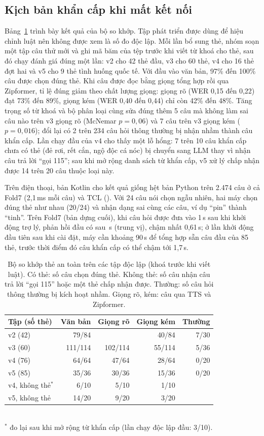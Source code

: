 \documentclass[a4paper,12pt,twocolumn]{article}
\begin{document}
\subsection{Kịch bản khẩn cấp khi mất kết nối}\label{sec:safety}
Bảng~\ref{tab:safety} trình bày kết quả của bộ so khớp. Tập phát triển được dùng để hiệu chỉnh luật nên không được xem là số đo độc lập. Mỗi lần bổ sung thẻ, nhóm soạn một tập câu thử mới và ghi mã băm của tệp trước khi viết từ khoá cho thẻ, sau đó chạy đánh giá đúng một lần: v2 cho 42 thẻ đầu, v3 cho 60 thẻ, v4 cho 16 thẻ đợt hai và v5 cho 9 thẻ tình huống quốc tế. Với đầu vào văn bản, 97\% đến 100\% câu được chọn đúng thẻ. Khi câu được đọc bằng giọng tổng hợp rồi qua Zipformer, tỉ lệ đúng giảm theo chất lượng giọng: giọng rõ (WER 0,15 đến 0,22) đạt 73\% đến 89\%, giọng kém (WER 0,40 đến 0,44) chỉ còn 42\% đến 48\%. Tăng trọng số từ khoá và bộ phân loại cùng sửa đúng thêm 5 câu mà không làm sai câu nào trên v3 giọng rõ (McNemar $p=0{,}06$) và 7 câu trên v3 giọng kém ($p=0{,}016$); đổi lại có 2 trên 234 câu hỏi thông thường bị nhận nhầm thành câu khẩn cấp. Lần chạy đầu của v4 cho thấy một lỗ hổng: 7 trên 10 câu khẩn cấp chưa có thẻ (đẻ rơi, rết cắn, ngộ độc cá nóc) bị chuyển sang LLM thay vì nhận câu trả lời ``gọi 115''; sau khi mở rộng danh sách từ khẩn cấp, v5 xử lý chấp nhận được 14 trên 20 câu thuộc loại này.

Trên điện thoại, bản Kotlin cho kết quả giống hệt bản Python trên 2.474 câu ở cả Fold7 (2,1\,ms mỗi câu) và TCL (\tclParityMs). Với 24 câu nói chọn ngẫu nhiên, hai máy chọn đúng thẻ như nhau (20/24) và nhận dạng sai cùng các câu, ví dụ ``pin'' thành ``tinh''. Trên Fold7 (bản dựng cuối), khi câu hỏi được đưa vào 1\,s sau khi khởi động trợ lý, phản hồi đầu có sau \hmSafeF\,s (trung vị), chậm nhất 0,61\,s; ở lần khởi động đầu tiên sau khi cài đặt, máy cần khoảng 90\,s để tổng hợp sẵn câu đầu của 85 thẻ, trước thời điểm đó câu khẩn cấp có thể chậm tới 1,7\,s.

\begin{table}[t]\centering\small
\caption{Bộ so khớp thẻ an toàn trên các tập độc lập (khoá trước khi viết luật). Có thẻ: số câu chọn đúng thẻ. Không thẻ: số câu nhận câu trả lời ``gọi 115'' hoặc một thẻ chấp nhận được. Thường: số câu hỏi thông thường bị kích hoạt nhầm. Giọng rõ, kém: câu qua TTS và Zipformer.}\label{tab:safety}
\setlength{\tabcolsep}{1.2pt}\footnotesize
\begin{tabular}{@{}lrrrr@{}}\toprule
Tập (số thẻ) & Văn bản & Giọng rõ & Giọng kém & Thường\\\midrule
v2 (42) & 79/84 & & 40/84 & 7/30\\
v3 (60) & 111/114 & 102/114 & 55/114 & 5/36\\
v4 (76) & 64/64 & 47/64 & 28/64 & 0/20\\
v5 (85) & 35/36 & 30/36 & 15/36 & 0/20\\\midrule
v4, không thẻ$^{*}$ & 6/10 & 5/10 & 1/10 & \\
v5, không thẻ & 14/20 & 9/20 & 3/20 & \\\bottomrule
\end{tabular}\\[1pt]
{\footnotesize $^{*}$ đo lại sau khi mở rộng từ khẩn cấp (lần chạy độc lập đầu: 3/10).}
\end{table}
\end{document}
